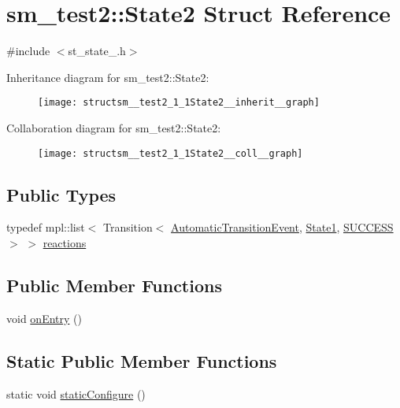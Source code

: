\hypertarget{structsm__test2_1_1State2}{}\section{sm\+\_\+test2\+:\+:State2 Struct Reference}
\label{structsm__test2_1_1State2}


{\ttfamily \#include $<$st\+\_\+state\+\_.\+h$>$}



Inheritance diagram for sm\+\_\+test2\+:\+:State2\+:
\nopagebreak
\begin{figure}[H]
\begin{center}
\leavevmode
\texttt{[image: structsm\_\_test2\_1\_1State2\_\_inherit\_\_graph]}
\end{center}
\end{figure}


Collaboration diagram for sm\+\_\+test2\+:\+:State2\+:
\nopagebreak
\begin{figure}[H]
\begin{center}
\leavevmode
\texttt{[image: structsm\_\_test2\_1\_1State2\_\_coll\_\_graph]}
\end{center}
\end{figure}
\subsection*{Public Types}
\begin{DoxyCompactItemize}
\item 
typedef mpl\+::list$<$ Transition$<$ \hyperlink{structsm__test2_1_1AutomaticTransitionEvent}{Automatic\+Transition\+Event}, \hyperlink{structsm__test2_1_1State1}{State1}, \hyperlink{classSUCCESS}{S\+U\+C\+C\+E\+SS} $>$ $>$ \hyperlink{structsm__test2_1_1State2_ac0be669416dfba18151af79b1eb2b1de}{reactions}
\end{DoxyCompactItemize}
\subsection*{Public Member Functions}
\begin{DoxyCompactItemize}
\item 
void \hyperlink{structsm__test2_1_1State2_aac555da5724e95296482d06026bbca88}{on\+Entry} ()
\end{DoxyCompactItemize}
\subsection*{Static Public Member Functions}
\begin{DoxyCompactItemize}
\item 
static void \hyperlink{structsm__test2_1_1State2_a0bbdc8382042af7edd85a3c048ad7c7c}{static\+Configure} ()
\end{DoxyCompactItemize}
